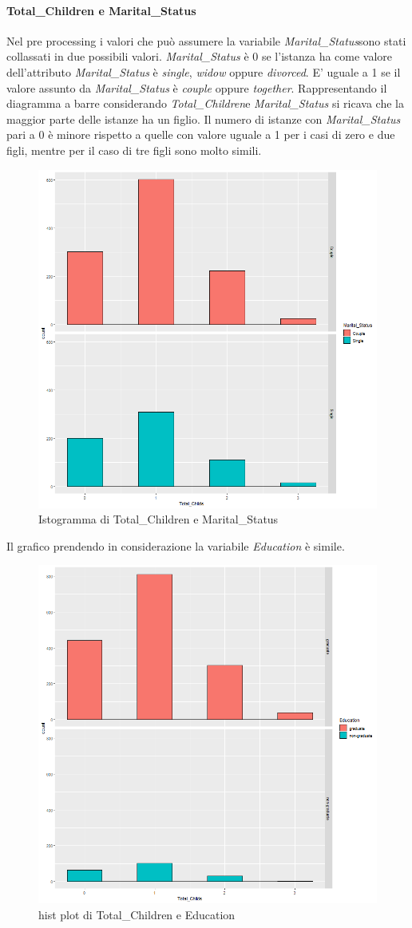 \documentclass[letterpaper,11pt]{article}
\begin{document}
\paragraph{Total\_Children e Marital\_Status}
Nel pre processing i valori che può assumere la variabile \textit{Marital\_Status}sono stati collassati in due possibili valori.
\textit{Marital\_Status} è 0 se l'istanza ha come valore dell'attributo \textit{Marital\_Status} è \textit{single}, \textit{widow} oppure \textit{divorced}.
E' uguale a 1 se il valore assunto da \textit{Marital\_Status} è \textit{couple} oppure \textit{together}.
Rappresentando il diagramma a barre considerando \textit{Total\_Children}e \textit{Marital\_Status} si ricava che la maggior parte delle istanze ha un figlio. Il numero di istanze con \textit{Marital\_Status} pari a 0 è minore rispetto a quelle con valore uguale a 1 per i casi di zero e due figli, mentre per il caso di tre figli sono molto simili.


\begin{figure}[h!]
    \centering
    \includegraphics[width=.4\textwidth]{Img/EDA/EDA017.png}
    \caption{Istogramma di Total\_Children e Marital\_Status}
    \label{fig:IstogrammaTcMaritalStatus}
\end{figure}

Il grafico prendendo in considerazione la variabile \textit{Education} è simile. 

\begin{figure}[h!]
    \centering
    \includegraphics[width=.4\textwidth]{Img/EDA/EDA018.png}
    \caption{hist plot di Total\_Children e Education}
    \label{fig:IstogrammaTcEducation}
\end{figure}
\end{document}
